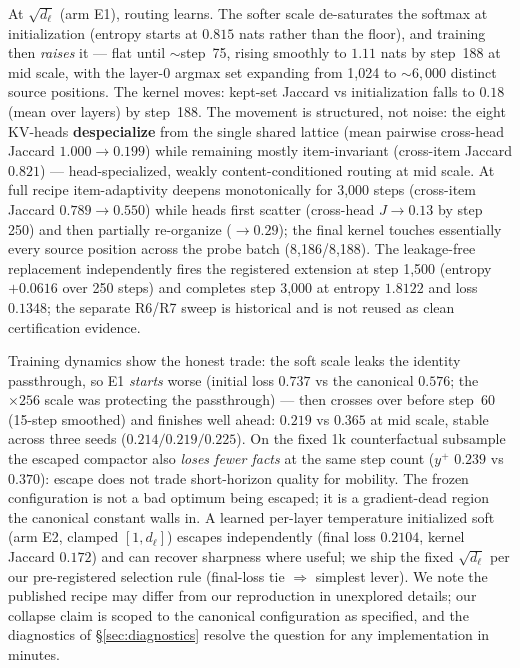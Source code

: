 \documentclass[11pt]{article}
\newcommand{\dl}{d_{\ell}}
\begin{document}
At $\sqrt{\dl}$ (arm E1), routing learns. The softer scale de-saturates
the softmax at initialization (entropy starts at $0.815$ nats rather
than the floor), and training then \emph{raises} it --- flat until
${\sim}$step~75, rising smoothly to $1.11$ nats by step~188 at mid
scale, with the layer-0 argmax set expanding from 1{,}024 to
${\sim}6{,}000$ distinct source positions. The kernel moves: kept-set
Jaccard vs initialization falls to $0.18$ (mean over layers) by
step~188. The movement is structured, not noise: the eight KV-heads
\textbf{despecialize} from the single shared lattice (mean pairwise
cross-head Jaccard $1.000 \to 0.199$) while remaining mostly
item-invariant (cross-item Jaccard $0.821$) --- head-specialized, weakly
content-conditioned routing at mid scale. At full recipe item-adaptivity deepens monotonically for 3{,}000 steps
(cross-item Jaccard $0.789 \to 0.550$) while heads first scatter
(cross-head $J \to 0.13$ by step 250) and then partially re-organize
($\to 0.29$); the final kernel touches essentially every source
position across the probe batch (8{,}186/8{,}188).
The leakage-free replacement independently fires the registered extension
at step 1{,}500 (entropy $+0.0616$ over 250 steps) and completes step 3{,}000
at entropy $1.8122$ and loss $0.1348$; the separate R6/R7 sweep is historical
and is not reused as clean certification evidence.

Training dynamics show the honest trade: the soft scale leaks the
identity passthrough, so E1 \emph{starts} worse (initial loss $0.737$ vs
the canonical $0.576$; the $\times256$ scale was protecting the
passthrough) --- then crosses over before step~60 (15-step smoothed) and
finishes well ahead: $0.219$ vs $0.365$ at mid scale, stable across
three seeds ($0.214/0.219/0.225$). On the fixed 1k counterfactual
subsample the escaped compactor also \emph{loses fewer facts} at the
same step count ($y^{+}$ $0.239$ vs $0.370$): escape does not trade
short-horizon quality for mobility. The frozen configuration is not a
bad optimum being escaped; it is a gradient-dead region the canonical
constant walls in. A learned per-layer temperature initialized soft
(arm E2, clamped $[1,\dl]$) escapes independently (final loss $0.2104$,
kernel Jaccard $0.172$) and can recover sharpness where useful; we ship
the fixed $\sqrt{\dl}$ per our pre-registered selection rule (final-loss
tie $\Rightarrow$ simplest lever). We note the published recipe may
differ from our reproduction in unexplored details; our collapse claim
is scoped to the canonical configuration as specified, and the
diagnostics of \S\ref{sec:diagnostics} resolve the question for any
implementation in minutes.
\end{document}

